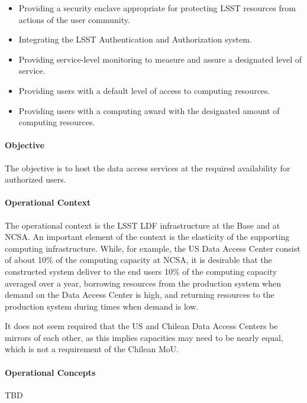 \begin{itemize}
\item Providing a security enclave appropriate for protecting LSST resources from actions of the user community.

\item Integrating the LSST Authentication and Authorization system.

\item Providing service-level monitoring to measure and assure a designated level of service.

\item Providing users with a default level of access to computing resources.

\item Providing users with a computing award with the designated amount of computing resources.

\end{itemize}

\paragraph{Objective}

The objective is to host the data access services at the required availability for authorized users.

\paragraph{Operational Context}

The operational context is the LSST LDF infrastructure at the Base and at NCSA. An important element of the context is the elasticity of the supporting computing infrastructure. While, for example, the US Data Access Center consist of about 10\% of the computing capacity at NCSA, it is desirable that the constructed system deliver to the end users 10\% of the computing capacity averaged over a year, borrowing resources from the production system when demand on the Data Access Center is high, and returning resources to the production system during times when demand is low.

It does not seem required that the US and Chilean Data Access Centers be mirrors of each other, as this implies capacities may need to be nearly equal, which is not a requirement of the Chilean MoU.
\paragraph{Operational Concepts}
TBD
